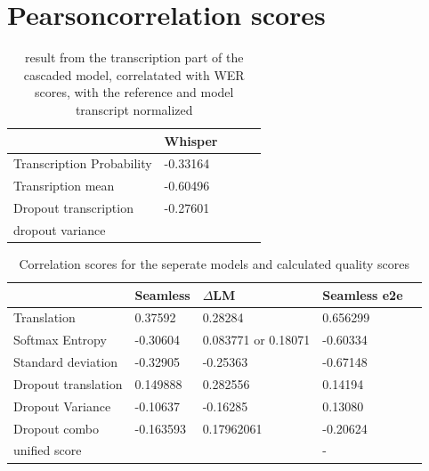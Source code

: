 \section{Pearsoncorrelation scores}
\begin{table}[ht]
  \begin{tabular}
  {l|llll}
  &  Whisper \\ \hline
  Transcription Probability& -0.33164 \\
  Transription mean & -0.60496 \\ \hline
  Dropout transcription & -0.27601 \\
  dropout variance &  \\
  \end{tabular}
  \label{transcription results}
  \caption{result from the transcription part of the cascaded model, correlatated with WER scores, with the reference and model transcript normalized}
\end{table}

\begin{table}[ht]
\begin{tabular}{l|llll}
    & Seamless & $\Delta$LM&  Seamless e2e\\ \hline
Translation & 0.37592 & 0.28284 & 0.656299\\ 
Softmax Entropy & -0.30604   & 0.083771 or  0.18071 & -0.60334 \\
Standard deviation & -0.32905  & -0.25363& -0.67148 \\ \hline

Dropout translation & 0.149888 & 0.282556& 0.14194\\

Dropout Variance &-0.10637 & -0.16285& 0.13080\\
Dropout combo & -0.163593& 0.17962061& -0.20624\\
\hline
unified score   &  &  & - 

\end{tabular}
\label{results}
\caption{Correlation scores for the seperate models and calculated quality scores}
\end{table}
